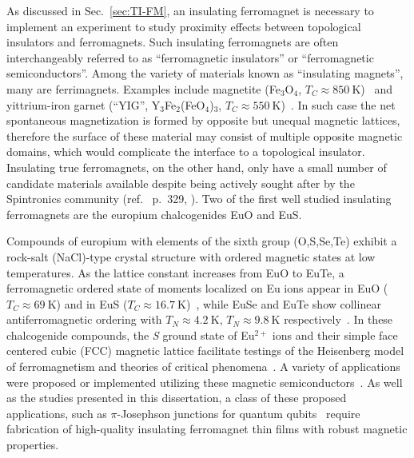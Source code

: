 As discussed in Sec.~\ref{sec:TI-FM}, an insulating ferromagnet is necessary to implement an experiment to study proximity effects between topological insulators and ferromagnets. Such insulating ferromagnets are often interchangeably referred to as ``ferromagnetic insulators'' or ``ferromagnetic semiconductors''. Among the variety of materials known as ``insulating magnets'', many are ferrimagnets. Examples include magnetite (Fe$_3$O$_4$, $T_C\approx850~\mathrm{K}$)~\cite{Neel1948} and yittrium-iron garnet (``YIG'', Y$_3$Fe$_2$(FeO$_4$)$_3$, $T_C\approx550~\mathrm{K}$)~\cite{YIG}. In such case the net spontaneous magnetization is formed by opposite but unequal magnetic lattices, therefore the surface of these material may consist of multiple opposite magnetic domains, which would complicate the interface to a topological insulator. Insulating true ferromagnets, on the other hand, only have a small number of candidate materials available despite being actively sought after by the Spintronics community (ref.~\cite{kittel} p.~329, \cite{Yi2014, Wolf2001}). Two of the first well studied insulating ferromagnets are the europium chalcogenides EuO and EuS.

Compounds of europium with elements of the sixth group (O,S,Se,Te) exhibit a rock-salt (NaCl)-type crystal structure with ordered magnetic states at low temperatures. As the lattice constant increases from EuO to EuTe, a ferromagnetic ordered state of moments localized on Eu ions appear in EuO ($T_C\approx69~\mathrm{K}$) and in EuS ($T_C\approx16.7~\mathrm{K}$)~\cite{EuO_TC, EuS_Shafer}, while EuSe and EuTe show collinear antiferromagnetic ordering with $T_N\approx4.2~\mathrm{K}$, $T_N\approx9.8~\mathrm{K}$ respectively~\cite{EuSe_AF, EuTe_AF}. In these chalcogenide compounds, the \textit{S} ground state of Eu$^{2+}$ ions and their simple face centered cubic (FCC) magnetic lattice facilitate testings of the Heisenberg model of ferromagnetism and theories of critical phenomena~\cite{divalent_Eu,  EuS_neighbor_exchange, EuS_critical, EuS_neutron, EuS_spin_wave}. A variety of applications were proposed or implemented utilizing these magnetic semiconductors~\cite{EuS_spin_filter, EuS_app1, EuS_spin_filter2}. As well as the studies presented in this dissertation, a class of these proposed applications, such as $\pi$-Josephson junctions for quantum qubits~\cite{pi_qubit, pi_junction, Jing} require fabrication of high-quality insulating ferromagnet thin films with robust magnetic properties.
